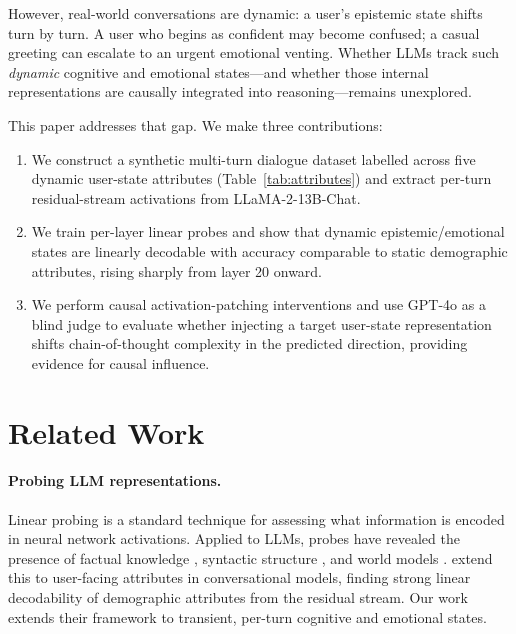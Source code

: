 \documentclass[11pt]{article}
\begin{document}
However, real-world conversations are dynamic: a user's epistemic state shifts
turn by turn.  A user who begins as confident may become confused; a casual
greeting can escalate to an urgent emotional venting.  Whether LLMs track such
\emph{dynamic} cognitive and emotional states—and whether those internal
representations are causally integrated into reasoning—remains unexplored.

This paper addresses that gap.  We make three contributions:
\begin{enumerate}
  \item We construct a synthetic multi-turn dialogue dataset labelled across
        five dynamic user-state attributes (Table~\ref{tab:attributes}) and
        extract per-turn residual-stream activations from LLaMA-2-13B-Chat.
  \item We train per-layer linear probes and show that dynamic epistemic/emotional
        states are linearly decodable with accuracy comparable to static
        demographic attributes, rising sharply from layer 20 onward.
  \item We perform causal activation-patching interventions and use GPT-4o as
        a blind judge to evaluate whether injecting a target user-state
        representation shifts chain-of-thought complexity in the predicted
        direction, providing evidence for causal influence.
\end{enumerate}

\section{Related Work}

\paragraph{Probing LLM representations.}
Linear probing \citep{alain2017understanding} is a standard technique for
assessing what information is encoded in neural network activations.  Applied
to LLMs, probes have revealed the presence of factual knowledge
\citep{petroni2019language}, syntactic structure \citep{tenney2019bert}, and
world models \citep{li2023emergent}.  \citet{chen2024probing} extend this to
user-facing attributes in conversational models, finding strong linear
decodability of demographic attributes from the residual stream.  Our work
extends their framework to transient, per-turn cognitive and emotional states.
\end{document}
